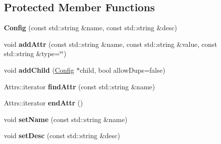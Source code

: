 \subsection*{Protected Member Functions}
\begin{DoxyCompactItemize}
\item 
\hypertarget{classtheoria_1_1config_1_1Config_a232146edc23baa804dbc82ffd3158f49}{{\bfseries Config} (const std\+::string \&name, const std\+::string \&desc)}\label{classtheoria_1_1config_1_1Config_a232146edc23baa804dbc82ffd3158f49}

\item 
\hypertarget{classtheoria_1_1config_1_1Config_a043dff1e32568ef63eb10c557e6f672d}{void {\bfseries add\+Attr} (const std\+::string \&name, const std\+::string \&value, const std\+::string \&type=\char`\"{}\char`\"{})}\label{classtheoria_1_1config_1_1Config_a043dff1e32568ef63eb10c557e6f672d}

\item 
\hypertarget{classtheoria_1_1config_1_1Config_ad96085447d36129bb53057c28bc43e4b}{void {\bfseries add\+Child} (\hyperlink{classtheoria_1_1config_1_1Config}{Config} $\ast$child, bool allow\+Dups=false)}\label{classtheoria_1_1config_1_1Config_ad96085447d36129bb53057c28bc43e4b}

\item 
\hypertarget{classtheoria_1_1config_1_1Config_a5c3e05b3d7119443b0bcb61eb0404829}{Attrs\+::iterator {\bfseries find\+Attr} (const std\+::string \&name)}\label{classtheoria_1_1config_1_1Config_a5c3e05b3d7119443b0bcb61eb0404829}

\item 
\hypertarget{classtheoria_1_1config_1_1Config_adc788e451cd49c6b2c85948bf8f9fb21}{Attrs\+::iterator {\bfseries end\+Attr} ()}\label{classtheoria_1_1config_1_1Config_adc788e451cd49c6b2c85948bf8f9fb21}

\item 
\hypertarget{classtheoria_1_1config_1_1Config_a75b3cca96301a65a4eef01d5c36166c6}{void {\bfseries set\+Name} (const std\+::string \&name)}\label{classtheoria_1_1config_1_1Config_a75b3cca96301a65a4eef01d5c36166c6}

\item 
\hypertarget{classtheoria_1_1config_1_1Config_adf4e6820b56f6ae52678b493819504ac}{void {\bfseries set\+Desc} (const std\+::string \&desc)}\label{classtheoria_1_1config_1_1Config_adf4e6820b56f6ae52678b493819504ac}

\end{DoxyCompactItemize}
